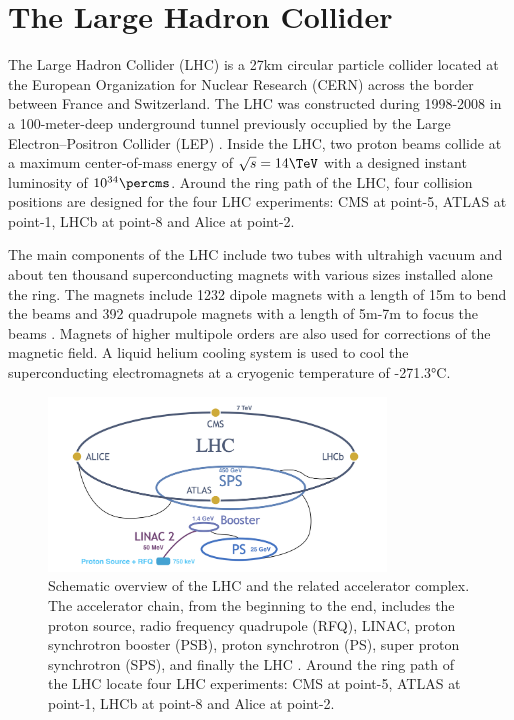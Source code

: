 
\section{The Large Hadron Collider}
\label{sec:cmsExperiment:lhc}

The Large Hadron Collider (LHC) \cite{exhep:lhc:Evans:2008zzb} is a 27km circular particle collider located at the European Organization for Nuclear Research (CERN) across the border between France and Switzerland. The LHC was constructed during 1998-2008 in a 100-meter-deep underground tunnel previously occuplied by the Large Electron–Positron Collider (LEP) \cite{exhep:lep:Myers:1991ym}. Inside the LHC, two proton beams collide at a maximum center-of-mass energy of $\sqrt{s}=14\TeV$ with a designed instant luminosity of $10^{34}\percms$. Around the ring path of the LHC, four collision positions are designed for the four LHC experiments: CMS \cite{exhep:cms:Chatrchyan:2008aa} at point-5, ATLAS \cite{exhep:atlas:Aad:2008zzm} at point-1, LHCb \cite{exhep:lhcb:Alves:2008zz} at point-8 and Alice \cite{exhep:alice:Aamodt:2008zz} at point-2.


The main components of the LHC include two tubes with ultrahigh vacuum and about ten thousand superconducting magnets with various sizes installed alone the ring. The magnets include 1232 dipole magnets with a length of 15m to bend the beams and 392 quadrupole magnets with a length of 5m-7m to focus the beams \cite{exhep:lhcFactsFigures}. Magnets of higher multipole orders are also used for corrections of the magnetic field. A liquid helium cooling system is used to cool the superconducting electromagnets at a cryogenic temperature of -271.3\si{\degreeCelsius}. 


\begin{figure}[ht]
    \centering
    \includegraphics[width=0.8\textwidth]{chapters/CMSExperiment/sectionLHC/figures/lhc.png}
    \caption{Schematic overview of the LHC and the related accelerator complex. The accelerator chain, from the beginning to the end, includes the proton source, radio frequency quadrupole (RFQ), LINAC, proton synchrotron booster (PSB), proton synchrotron (PS), super proton synchrotron (SPS), and finally the LHC \cite{exhep:lhcInject:Benedikt:2004wm}. Around the ring path of the LHC locate four LHC experiments: CMS \cite{exhep:cms:Chatrchyan:2008aa} at point-5, ATLAS \cite{exhep:atlas:Aad:2008zzm} at point-1, LHCb \cite{exhep:lhcb:Alves:2008zz} at point-8 and Alice \cite{exhep:alice:Aamodt:2008zz} at point-2.}
    \label{fig:cmsExperiment:lhc:map}
\end{figure}

